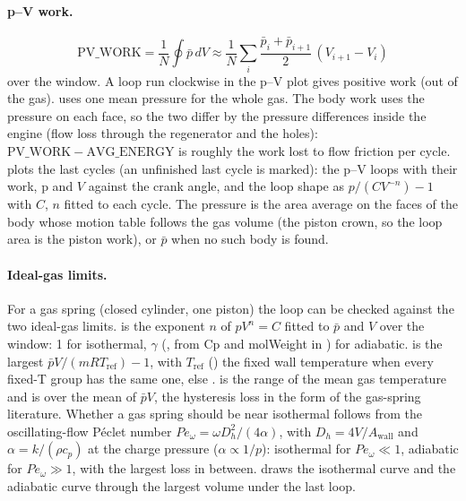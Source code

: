 \paragraph{p--V work.}
\begin{equation}
\mathrm{PV\_WORK} = \frac{1}{N}\oint \bar{p}\, dV \approx \frac{1}{N}\sum_i \frac{\bar{p}_i + \bar{p}_{i+1}}{2}\,(V_{i+1} - V_i)
\end{equation}
over the window. A loop run clockwise in the p--V plot gives positive work (out of the gas).  uses one mean pressure for the whole gas. The body work uses the pressure on each face, so the two differ by the pressure differences inside the engine (flow loss through the regenerator and the holes): $\mathrm{PV\_WORK} - \mathrm{AVG\_ENERGY}$ is roughly the work lost to flow friction per cycle.  plots the last  cycles (an unfinished last cycle is marked): the p--V loops with their work, p and $V$ against the crank angle, and the loop shape as $p/(C V^{-n}) - 1$ with $C$, $n$ fitted to each cycle. The pressure is the area average on the faces of the body whose motion table follows the gas volume (the piston crown, so the loop area is the piston work), or $\bar{p}$ when no such body is found.

\paragraph{Ideal-gas limits.} For a gas spring (closed cylinder, one piston) the loop can be checked against the two ideal-gas limits.  is the exponent $n$ of $p V^n = C$ fitted to $\bar{p}$ and $V$ over the window: 1 for isothermal, $\gamma$ (, from Cp and molWeight in ) for adiabatic.  is the largest $\bar{p}V/(m R T_\mathrm{ref}) - 1$, with $T_\mathrm{ref}$ () the fixed wall temperature when every fixed-T group has the same one, else .  is the range of the mean gas temperature and  is  over the mean of $\bar{p}V$, the hysteresis loss in the form of the gas-spring literature. Whether a gas spring should be near isothermal follows from the oscillating-flow P\'eclet number $Pe_\omega = \omega D_h^2/(4\alpha)$, with $D_h = 4V/A_\mathrm{wall}$ and $\alpha = k/(\rho c_p)$ at the charge pressure ($\alpha \propto 1/p$): isothermal for $Pe_\omega \ll 1$, adiabatic for $Pe_\omega \gg 1$, with the largest loss in between.  draws the isothermal curve and the adiabatic curve through the largest volume under the last loop.

